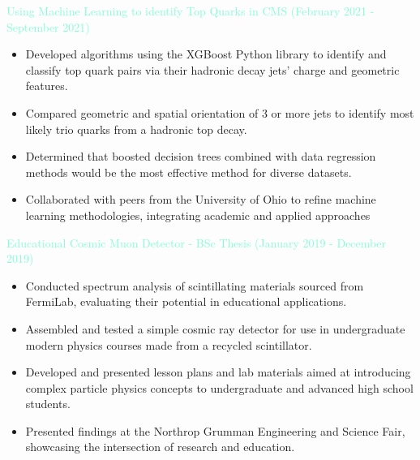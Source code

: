 \documentclass[10pt,a4paper,ragged2e,withhyper]{altacv}
\begin{document}
\begin{paracol}{2}
\begin{itemize}
\end{itemize}




\textcolor{Aquamarine}{Using Machine Learning to identify Top Quarks in CMS (February 2021 - September 2021)}
\begin{itemize}
    \item Developed algorithms using the XGBoost Python library to identify and classify top quark pairs via their hadronic decay jets’ charge and geometric features. 
    \item Compared geometric and spatial orientation of 3 or more jets to identify most likely trio quarks from a hadronic top decay.
    \item Determined that boosted decision trees combined with data regression methods would be the most effective method for diverse datasets.
    \item Collaborated with peers from the University of Ohio to refine machine learning methodologies, integrating academic and applied approaches

\end{itemize}
\textcolor{Aquamarine}{Educational Cosmic Muon Detector - BSc Thesis (January 2019 - December 2019)}
\smallskip
\begin{itemize}
    \item Conducted spectrum analysis of scintillating materials sourced from FermiLab, evaluating their potential in educational applications. 
    \item Assembled and tested a simple cosmic ray detector for use in undergraduate modern physics courses made from a recycled scintillator. 
    \item Developed and presented lesson plans and lab materials aimed at introducing complex particle physics concepts to undergraduate and advanced high school students. 
    \item Presented findings at the Northrop Grumman Engineering and Science Fair, showcasing the intersection of research and education.

\end{itemize}




\end{paracol}
\end{document}
